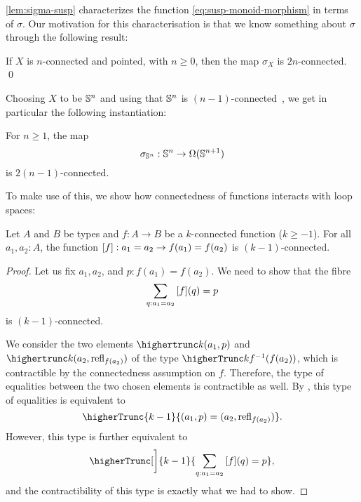 \documentclass[english,a4paper]{lmcs}
\begin{document}
\cref{lem:sigma-susp} characterizes the function \eqref{eq:susp-monoid-morphism}
in terms of $\sigma$.
Our motivation for this characterisation is that we know something about $\sigma$ through the following result:

\begin{thm} \label{thm:freudenthal}
    If $X$ is $n$-connected and pointed, with $n \geq 0$, then the map $\sigma_X$ is $2n$-connected. \qed
\end{thm}


Choosing $X$ to be ${\mathbb S^{n}}$ and using that ${\mathbb S^{n}}$ is $(n-1)$-connected~\cite[Corollary 8.2.2]{HoTT}, we get in particular the following instantiation:


\begin{cor} \label{cor:sigma-truncated}
For $n \geq 1$, the map
\begin{equation}
  \sigma_{{\mathbb S^{n}}} : {\mathbb S^{n}} \to \Omega({\mathbb S^{n+1}})
\end{equation}
is $2(n-1)$-connected.
\end{cor}


To make use of this, we show how connectedness of functions interacts with loop spaces:

\begin{lem} \label{lem:conn-ap}
    Let $A$ and $B$ be types and $f : A \to B$ be a $k$-connected function ($k \geq -1$).
    For all $a_1, a_2 : A$, the function $\mathop{\left[{f}\right]} : a_1 = a_2 \to f(a_1) = f(a_2)$ is $(k-1)$-connected.
\end{lem}
\begin{proof}
    Let us fix $a_1, a_2$, and $p : f(a_1) = f(a_2)$.
    We need to show that the fibre
    \begin{equation}
      \sum_{q : a_1 = a_2}\mathop{\left[{f}\right]}(q) = p
    \end{equation}
    is $(k-1)$-connected.

    We consider the two elements
    $\highertrunc k {(a_1, p)}$
    and
    $\highertrunc k {(a_2, \refl {f(a_2)})}$ of
    the type $\higherTrunc k {f^{-1}(f(a_2))}$, which is contractible by the connectedness assumption on $f$.
    Therefore, the type of equalities between the two chosen elements is contractible as well.
    By \cite[Theorem 7.3.12]{HoTT}, this type of equalities is equivalent to
    \begin{equation} \label{eq:eq-in-truncated-fibre}
    \higherTrunc {k-1} {(a_1, p) = (a_2, \refl {f(a_2)})}.
    \end{equation}
    However,
    this type is further equivalent to
    \begin{equation}
      \higherTrunc[\bigg] {k-1} {\sum_{q : a_1 = a_2} \ap f(q) = p},
    \end{equation}
    and the contractibility of this type is exactly what we had to show.
\end{proof}
\end{document}
